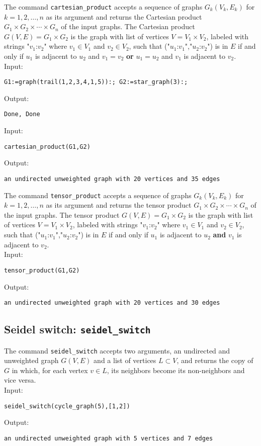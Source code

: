 \documentclass[a4paper,11pt]{article}
\begin{document}
The command {\tt cartesian\_product} accepts a sequence of graphs $ G_k(V_k,E_k) $ for $ k=1,2,\dots,n $ as its argument and returns the Cartesian product $ G_1\times G_2\times\cdots\times G_n $ of the input graphs. The Cartesian product $ G(V,E)=G_1\times G_2 $ is the graph with list of vertices $ V=V_1\times V_2 $, labeled with strings "$ v_1 $:$ v_2 $" where $ v_1\in V_1 $ and $ v_2\in V_2 $, such that ("$ u_1 $:$ v_1 $","$ u_2 $:$ v_2 $") is in $ E $ if and only if $ u_1 $ is adjacent to $ u_2 $ and $ v_1=v_2 $ \textbf{or} $ u_1=u_2 $ and $ v_1 $ is adjacent to $ v_2 $.\\
Input:
\begin{center}
  \tt G1:=graph(trail(1,2,3,4,1,5)):; G2:=star\_graph(3):;
\end{center}
Output:
\begin{center}
  \tt Done, Done
\end{center}
Input:
\begin{center}
  \tt cartesian\_product(G1,G2)
\end{center}
Output:
\begin{center}
  \tt an undirected unweighted graph with 20 vertices and 35 edges
\end{center}

The command {\tt tensor\_product} accepts a sequence of graphs $ G_k(V_k,E_k) $ for $ k=1,2,\dots,n $ as its argument and returns the tensor product $ G_1\times G_2\times\cdots\times G_n $ of the input graphs. The tensor product $ G(V,E)=G_1\times G_2 $ is the graph with list of vertices $ V=V_1\times V_2 $, labeled with strings "$ v_1 $:$ v_2 $" where $ v_1\in V_1 $ and $ v_2\in V_2 $, such that ("$ u_1 $:$ v_1 $","$ u_2 $:$ v_2 $") is in $ E $ if and only if $ u_1 $ is adjacent to $ u_2 $ \textbf{and} $ v_1 $ is adjacent to $ v_2 $.\\
Input:
\begin{center}
  \tt tensor\_product(G1,G2)
\end{center}
Output:
\begin{center}
  \tt an undirected unweighted graph with 20 vertices and 30 edges
\end{center}

\subsection{Seidel switch: {\tt seidel\_switch}}

The command {\tt seidel\_switch} accepts two arguments, an undirected and unweighted graph $ G(V,E) $ and a list of vertices $ L\subset V $, and returns the copy of $ G $ in which, for each vertex $ v\in L $, its neighbors become its non-neighbors and vice versa.\\
Input:
\begin{center}
  \tt seidel\_switch(cycle\_graph(5),[1,2])
\end{center}
Output:
\begin{center}
  \tt an undirected unweighted graph with 5 vertices and 7 edges
\end{center}
\end{document}
